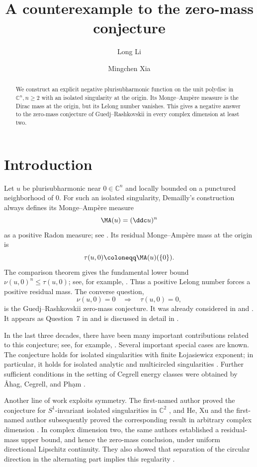 \documentclass[11pt,a4paper]{article}
\title{A counterexample to the zero-mass conjecture}
\author{Long Li \and Mingchen Xia}
\date{}
\begin{document}
\maketitle

\begin{abstract}
We construct an explicit negative plurisubharmonic function on the unit polydisc in $\mathbb C^n, n\ge 2$ with an isolated singularity at the origin. Its Monge--Amp\`{e}re measure is the Dirac mass at the origin, but its Lelong number vanishes. This gives a negative answer to the zero-mass conjecture of Guedj--Rashkovskii in every complex dimension at least two.
\end{abstract}


\section{Introduction}

Let $u$ be plurisubharmonic near $0\in\mathbb C^n$ and locally bounded on a punctured neighborhood of $0$. For such an isolated singularity, Demailly's construction always defines its Monge--Amp\`ere measure
\[
  \MA(u)=(\ddc u)^n
\]
as a positive Radon measure; see \cite[Chapter~III, Proposition~4.1 and Corollary~4.3]{DemaillyCADG}. Its residual Monge--Amp\`ere mass at the origin is
\[
  \tau(u,0)\coloneqq\MA(u)(\{0\}).
\]
The comparison theorem gives the fundamental lower bound $\nu(u,0)^n\le\tau(u,0)$; see, for example, \cite{Demailly1993}. Thus a positive Lelong number forces a positive residual mass. The converse question,
\[
  \nu(u,0)=0\quad\Longrightarrow\quad\tau(u,0)=0,
\]
is the Guedj--Rashkovskii zero-mass conjecture. It was already considered in \cite{Gue10} and \cite{Ras01}. It appears as Question~7 in \cite{DGZ15} and is discussed in detail in \cite{Ras16}.

In the last three decades, there have been many important contributions related to this conjecture; see, for example, \cite{BFJ08,KR21,Ras01,Ras06,Ras13,Ras16,Wik05}.
Several important special cases are known. The conjecture holds for isolated singularities with finite {\L}ojasiewicz exponent; in particular, it holds for isolated analytic and multicircled singularities \cite{Ras16}. Further sufficient conditions in the setting of Cegrell energy classes were obtained by {\AA}hag, Cegrell, and Ph\d{a}m \cite{ACP19}.

Another line of work exploits symmetry. The first-named author proved the conjecture for $S^1$-invariant isolated singularities in $\mathbb C^2$ \cite{Li24}, and He, Xu and the first-named author subsequently proved the corresponding result in arbitrary complex dimension \cite{HLX23}. In complex dimension two, the same authors established a residual-mass upper bound, and hence the zero-mass conclusion, under uniform directional Lipschitz continuity. They also showed that separation of the circular direction in the alternating part implies this regularity \cite{HLX25}.
\end{document}
